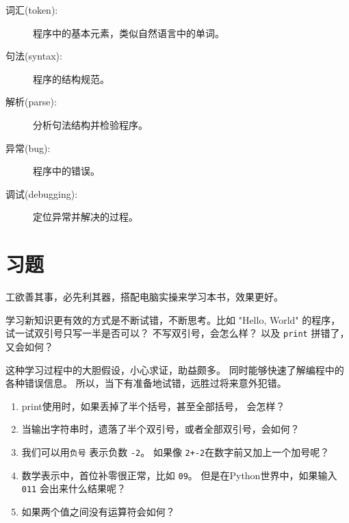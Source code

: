 \documentclass[10pt]{book}
\begin{document}
\begin{description}
\item[词汇(token):]  程序中的基本元素，类似自然语言中的单词。

\item[句法(syntax):] 程序的结构规范。

\item[解析(parse):] 分析句法结构并检验程序。

\item[异常(bug):] 程序中的错误。

\item[调试(debugging):] 定位异常并解决的过程。

\end{description}


\section{习题}

\begin{exercise}

工欲善其事，必先利其器，搭配电脑实操来学习本书，效果更好。

学习新知识更有效的方式是不断试错，不断思考。比如 "Hello, World" 的程序，
试一试双引号只写一半是否可以？
不写双引号，会怎么样？
以及 {\tt print} 拼错了，又会如何？

这种学习过程中的大胆假设，小心求证，助益颇多。
同时能够快速了解编程中的各种错误信息。
所以，当下有准备地试错，远胜过将来意外犯错。

\begin{enumerate}

\item print使用时，如果丢掉了半个括号，甚至全部括号， 会怎样？

\item 当输出字符串时，遗落了半个双引号，或者全部双引号，会如何？

\item 我们可以用{\tt 负号} 表示负数 {\tt -2}。
如果像 {\tt 2+-2}在数字前又加上一个加号呢？


\item 数学表示中，首位补零很正常，比如 {\tt09}。
但是在Python世界中，如果输入 {\tt 011} 会出来什么结果呢？

\item 如果两个值之间没有运算符会如何？

\end{enumerate}

\end{exercise}
\end{document}
